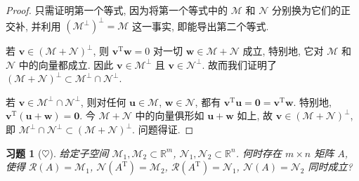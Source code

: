 \documentclass[UTF8]{ctexart}
\newtheorem{ex}[thm]{习题}
\begin{document}
\begin{proof}
  只需证明第一个等式, 因为将第一个等式中的 \(\mathcal{M}\) 和 \(\mathcal{N}\)
分别换为它们的正交补, 并利用 \((\mathcal{M}^{\perp})^{\perp} = \mathcal{M}\) 这一事实, 即能导出第二个等式.

若 \(\boldsymbol{v} \in (\mathcal{M}+\mathcal{N})^{\perp}\),
则 \(\boldsymbol{v}^{\mathrm{T}}\boldsymbol{w}=0\) 对一切 \(\boldsymbol{w} \in \mathcal{M}+\mathcal{N}\) 成立, 特别地, 它对 \(\mathcal{M}\) 和 \(\mathcal{N}\) 中的向量都成立.
因此 \(\boldsymbol{v} \in \mathcal{M}^{\perp}\) 且 \(\boldsymbol{v} \in \mathcal{N}^{\perp}\). 故而我们证明了 \((\mathcal{M}+\mathcal{N})^{\perp} \subset \mathcal{M}^{\perp}\cap \mathcal{N}^{\perp}\).

若 \(\boldsymbol{v} \in \mathcal{M}^{\perp}\cap \mathcal{N}^{\perp}\),
则对任何 \(\boldsymbol{u} \in \mathcal{M}\), \(\boldsymbol{w} \in \mathcal{N}\),
都有 \(\boldsymbol{v}^{\mathrm{T}} \boldsymbol{u} = \boldsymbol{0} = \boldsymbol{v}^{\mathrm{T}} \boldsymbol{w}\).
特别地, \(\boldsymbol{v}^{\mathrm{T}} (\boldsymbol{u}+\boldsymbol{w}) = \boldsymbol{0}\).
今 \(\mathcal{M}+\mathcal{N}\) 中的向量俱形如 \(\boldsymbol{u}+\boldsymbol{w}\) 如上,
故 \(\boldsymbol{v} \in (\mathcal{M}+\mathcal{N})^{\perp}\),
即 \(\mathcal{M}^{\perp} \cap \mathcal{N}^{\perp} \subset (\mathcal{M}+\mathcal{N})^{\perp}\).
问题得证.
\end{proof}

\begin{ex}[\(\heartsuit\)]
  给定子空间 \(\mathcal{M}_{1}, \mathcal{M}_{2} \subset \mathbb{R}^{m}\), \(\mathcal{N}_{1}, \mathcal{N}_{2} \subset \mathbb{R}^{n}\).
何时存在 \(m \times n\) 矩阵 \(A\), 使得
\(\mathcal{R}(A) = \mathcal{M}_{1}\), \(\mathcal{N}(A^{\mathrm{T}})=\mathcal{M}_{2}\), \(\mathcal{R}(A^{\mathrm{T}})=\mathcal{N}_{1}\), \(\mathcal{N}(A) = \mathcal{N}_{2}\)
同时成立?
\end{ex}
\end{document}
